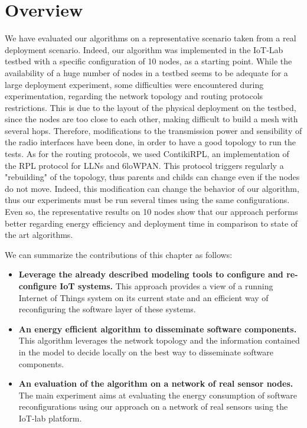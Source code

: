 \section{Overview}
We have evaluated our algorithms on a representative scenario taken from a real deployment scenario.
Indeed, our algorithm was implemented in the IoT-Lab testbed \cite{Fleury15iotlab} with a specific configuration of 10 nodes, as a starting point.
While the availability of a huge number of nodes in a testbed seems to be adequate for a large deployment experiment, some difficulties were encountered during experimentation, regarding the network topology and routing protocols restrictions.
This is due to the layout of the physical deployment on the testbed, since the nodes are too close to each other, making difficult to build a mesh with several hops.
Therefore, modifications to the transmission power and sensibility of the radio interfaces have been done, in order to have a good topology to run the tests.
As for the routing protocols, we used ContikiRPL\cite{tsiftes2010contikirpl}, an implementation of the RPL\cite{rfc6550} protocol for LLNs and 6loWPAN.
This protocol triggers regularly a "rebuilding" of the topology, thus parents and childs can change even if the nodes do not move.
Indeed, this modification can change the behavior of our algorithm, thus our experiments must be run several times using the same configurations.
Even so, the representative results on 10 nodes show that our approach performs better regarding energy efficiency and deployment time in comparison to state of the art algorithms.

We can summarize the contributions of this chapter as follows:
\begin{itemize}
	\item \textbf{Leverage the already described modeling tools to configure and re-configure IoT systems.} This approach provides a view of a running Internet of Things system on its current state and an efficient way of reconfiguring the software layer of these systems.
	\item \textbf{An energy efficient algorithm to disseminate software components.} This algorithm leverages the network topology and the information contained in the model to decide locally on the best way to disseminate software components.
	\item \textbf{An evaluation of the algorithm on a network of real sensor nodes.} The main experiment aims at evaluating the energy consumption of software reconfigurations using our approach on a network of real sensors using the IoT-lab platform.
\end{itemize}


